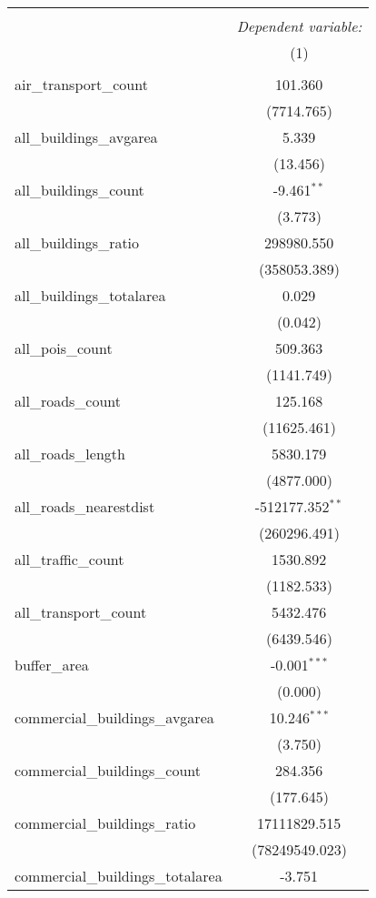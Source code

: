 \begin{table}[!htbp] \centering
\begin{tabular}{@{\extracolsep{5pt}}lc}
\\[-1.8ex]\hline
\hline \\[-1.8ex]
& \multicolumn{1}{c}{\textit{Dependent variable:}} \
\cr \cline{1-2}
\\[-1.8ex] & (1) \\
\hline \\[-1.8ex]
 air_transport_count & 101.360$^{}$ \\
  & (7714.765) \\
 all_buildings_avgarea & 5.339$^{}$ \\
  & (13.456) \\
 all_buildings_count & -9.461$^{**}$ \\
  & (3.773) \\
 all_buildings_ratio & 298980.550$^{}$ \\
  & (358053.389) \\
 all_buildings_totalarea & 0.029$^{}$ \\
  & (0.042) \\
 all_pois_count & 509.363$^{}$ \\
  & (1141.749) \\
 all_roads_count & 125.168$^{}$ \\
  & (11625.461) \\
 all_roads_length & 5830.179$^{}$ \\
  & (4877.000) \\
 all_roads_nearestdist & -512177.352$^{**}$ \\
  & (260296.491) \\
 all_traffic_count & 1530.892$^{}$ \\
  & (1182.533) \\
 all_transport_count & 5432.476$^{}$ \\
  & (6439.546) \\
 buffer_area & -0.001$^{***}$ \\
  & (0.000) \\
 commercial_buildings_avgarea & 10.246$^{***}$ \\
  & (3.750) \\
 commercial_buildings_count & 284.356$^{}$ \\
  & (177.645) \\
 commercial_buildings_ratio & 17111829.515$^{}$ \\
  & (78249549.023) \\
 commercial_buildings_totalarea & -3.751$^{}$ \\

\end{tabular}
\end{table}
